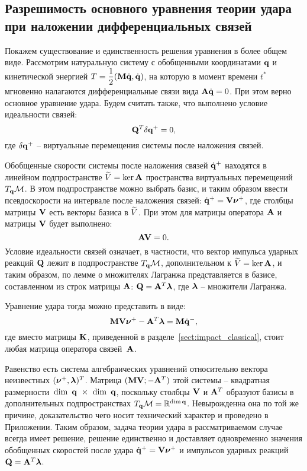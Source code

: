 
\subsection{Разрешимость основного уравнения теории удара при наложении дифференциальных связей}

Покажем существование и единственность решения уравнения в более общем виде.
Рассмотрим натуральную систему с обобщенными координатами $\mathbf{q}$ и кинетической энергией $T = \displaystyle\frac{\displaystyle 1}{\displaystyle 2}(\mathbf{M}\dot{\mathbf{q}}, \dot{\mathbf{q}})$, на которую в момент времени $t^*$ мгновенно налагаются дифференциальные связи вида $\mathbf{A}\dot{\mathbf{q}} = 0$.
При этом верно основное уравнение удара.
Будем считать также, что выполнено условие идеальности связей:
\begin{equation}\label{eq:constraints_ideal}
    \mathbf{Q}^T \delta\mathbf{q}^+ = 0,
\end{equation}
где $\delta\mathbf{q}^+$ -- виртуальные перемещения системы после наложения связей.

Обобщенные скорости системы после наложения связей $\dot{\mathbf{q}}^+$ находятся в линейном подпространстве $\widetilde{V} = \ker \mathbf{A}$ пространства виртуальных перемещений $T_{\mathbf{q}}\mathcal{M}$.
В этом подпространстве можно выбрать базис, и таким образом ввести псевдоскорости на интервале после наложения связей: $\dot{\mathbf{q}}^+ = \mathbf{V}\boldsymbol{\mathbf{\nu}}^+$, где столбцы матрицы $\mathbf{V}$ есть векторы базиса в $\widetilde{V}$.
При этом для матрицы оператора $\mathbf{A}$ и матрицы $\mathbf{V}$ будет выполнено:
\begin{equation}\label{eq:constraints_orth}
    \mathbf{A}\mathbf{V} = 0.
\end{equation}
Условие идеальности связей означает, в частности, что вектор импульса ударных реакций $\mathbf{Q}$ лежит в подпространстве $T_{\mathbf{q}}\mathcal{M}$, дополнительном к $\widetilde{V} = \ker \mathbf{A}$, и таким образом, по лемме о множителях Лагранжа \cite{KarapetyanKugushev2010} представляется в базисе, составленном из строк матрицы $\mathbf{A}$: $\mathbf{Q} = \mathbf{A}^T\boldsymbol{\mathbf{\lambda}}$, где $\boldsymbol{\mathbf{\lambda}}$ -- множители Лагранжа.

Уравнение удара тогда можно представить в виде:
\begin{equation}\label{eq:udar_mat_At}
    \mathbf{M}\mathbf{V}\boldsymbol{\mathbf{\nu}}^+ - \mathbf{A}^T\boldsymbol{\mathbf{\lambda}} = \mathbf{M}\dot{\mathbf{q}}^-,
\end{equation}
где вместо матрицы $\mathbf{K}$, приведенной в разделе~\ref{sect:impact_classical}, стоит любая матрица оператора связей~$\mathbf{A}$.

Равенство есть система алгебраических уравнений относительно вектора неизвестных $(\boldsymbol{\mathbf{\nu}}^+, \boldsymbol{\mathbf{\lambda}})^T$. Матрица $(\mathbf{M}\mathbf{V}; -\mathbf{A}^T)$ этой системы -- квадратная размерности~$\dim~\mathbf{q}~\times~\dim~\mathbf{q}$, поскольку столбцы $\mathbf{V}$ и $\mathbf{A}^T$ образуют базисы в дополнительных подпространствах $T_{\mathbf{q}}\mathcal{M} = \mathbb{R}^{\dim \mathbf{q}}$. Невырожденна она по той же причине, доказательство чего носит технический характер и проведено в Приложении. Таким образом, задача теории удара в рассматриваемом случае всегда имеет решение, решение единственно и доставляет одновременно значения обобщенных скоростей после удара $\dot{\mathbf{q}}^+ = \mathbf{V}\boldsymbol{\mathbf{\nu}}^+$ и импульсов ударных реакций~$\mathbf{Q} = \mathbf{A}^T\boldsymbol{\mathbf{\lambda}}$.

